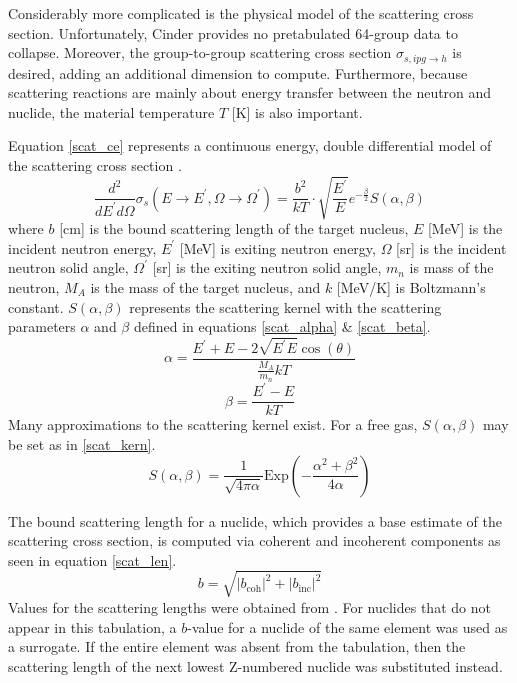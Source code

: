 Considerably more complicated is the physical model of the scattering cross section.  Unfortunately, 
Cinder provides no pretabulated 64-group data to collapse.  Moreover, the group-to-group scattering
cross section $\sigma_{s,ipg\to h}$ is desired, adding an additional dimension to compute.
Furthermore, because scattering reactions are mainly about energy transfer between the neutron and 
nuclide, the material temperature $T$ [K] is also important.

Equation \ref{scat_ce} represents a continuous energy, double differential model of the scattering 
cross section \cite{Yamamoto2006, Mattes2005}.
\begin{equation}
\label{scat_ce}
\frac{d^2}{dE^\prime d\Omega} \sigma_s(E\to E^\prime, \Omega\to\Omega^\prime) = \frac{b^2}{kT} \cdot 
            \sqrt{\frac{E^{\prime}}{E}} e^{-\frac{\beta}{2}} S(\alpha, \beta)
\end{equation}
where $b$ [cm] is the bound scattering length of the target nucleus, $E$ [MeV] is the incident
neutron energy, $E^\prime$ [MeV] is exiting neutron energy, $\Omega$ [sr] is the incident 
neutron solid angle, $\Omega^\prime$ [sr] is the exiting neutron solid angle,
$m_n$ is mass of the neutron, 
$M_A$ is the mass of the target nucleus, and $k$ [MeV/K] is Boltzmann's constant.  $S(\alpha, \beta)$
represents the scattering kernel with the scattering parameters $\alpha$ and $\beta$ defined in 
equations \ref{scat_alpha} \& \ref{scat_beta}.
\begin{equation}
\label{scat_alpha}
\alpha = \frac{E^\prime + E - 2\sqrt{E^\prime E}\cos(\theta)}{\frac{M_A}{m_n}kT}
\end{equation}
\begin{equation}
\label{scat_beta}
\beta = \frac{E^\prime - E}{kT}
\end{equation}
Many approximations to the scattering kernel exist.  For a free gas, $S(\alpha, \beta)$ may be set 
as in \ref{scat_kern}.
\begin{equation}
\label{scat_kern}
S(\alpha, \beta) = \frac{1}{\sqrt{4\pi\alpha}} \mbox{Exp}\left(-\frac{\alpha^2 + \beta^2}{4\alpha}\right)
\end{equation}

The bound scattering length for a nuclide, which provides a base estimate of the scattering cross section, 
is computed via coherent and incoherent components as seen in equation \ref{scat_len}.
\begin{equation}
\label{scat_len}
b = \sqrt{\left| b_{\mbox{coh}} \right|^2 + \left| b_{\mbox{inc}} \right|^2}
\end{equation}
Values for the scattering lengths were obtained from \cite{Sears1992}.  For nuclides
that do not appear in this tabulation, a $b$-value for a nuclide of the same element was
used as a surrogate.  If the entire element was absent from the tabulation, then the 
scattering length of the next lowest Z-numbered nuclide was substituted instead.

